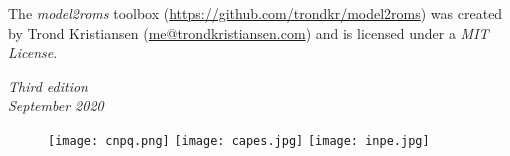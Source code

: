 \noindent The \textit{model2roms} toolbox (\textcolor{bleu_cite}{\href{https://github.com/trondkr/model2roms}{https://github.com/trondkr/model2roms}}) was created by Trond 
          Kristiansen (\textcolor{bleu_cite}{\href{mailto:me@trondkristiansen.com}{me@trondkristiansen.com}}) and is licensed under a \textit{MIT License}. 
\bigskip

\noindent \textit{Third edition} 
\\ 
\noindent \textit{September 2020} 
\\

\begin{figure}[H]
    \centering
    \vspace*{\fill}
    \texttt{[image: cnpq.png]}
    \hspace{3cm}
    \texttt{[image: capes.jpg]}
    \hspace{3cm}    
    \texttt{[image: inpe.jpg]}
\end{figure}

